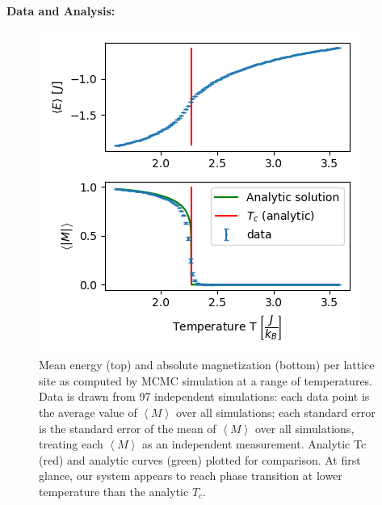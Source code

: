 \documentclass[letter,scriptaddress,twocolumn, prl]{revtex4}
\begin{document}
\textbf{Data and Analysis:}

\begin{figure}[h]
	\begin{center}
		\includegraphics[width=.5\textwidth]{figs/fig2_EMplots.png}
		\caption{Mean energy (top) and absolute magnetization (bottom) per lattice site as computed by MCMC simulation at a range of temperatures. Data is drawn from 97 independent simulations: each data point is the average value of $\left\langle M \right\rangle$ over all simulations; each standard error is the standard error of the mean of $\left\langle M \right\rangle$ over all simulations, treating each $\left\langle M \right\rangle$ as an independent measurement. Analytic Tc (red) and analytic curves (green) plotted for comparison. At first glance, our system appears to reach phase transition at lower temperature than the analytic $T_c$.}
		\label{fig:fig2}
	\end{center}
\end{figure}
\end{document}
